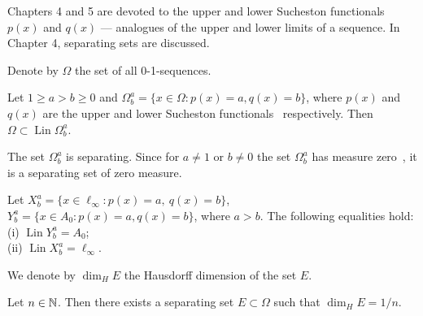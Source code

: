Chapters 4 and 5 are devoted to the upper and lower Sucheston functionals $p(x)$ and $q(x)$ —
analogues of the upper and lower limits of a sequence.
In Chapter 4, separating sets are discussed.

Denote by $\Omega$ the set of all 0-1-sequences.

	Let
	$1 \geq a > b \geq 0$ and
	$\Omega^a_b = \{x\in\Omega : p(x) = a, q(x) = b\}$,
	where $p(x)$ and $q(x)$ are the upper and lower Sucheston functionals~\cite{sucheston1967banach} respectively.
	Then $\Omega \subset \operatorname{Lin} \Omega^a_b$.

	The set $\Omega^a_b$ is separating.
	Since for $a\neq 1$ or $b\neq 0$ the set $\Omega^a_b$ has measure zero~\cite{semenov2010characteristic_eng,connor1990almost},
	it is a separating set of zero measure.

Let $X^a_b = \{x\in\ell_\infty : p(x) = a,~ q(x) = b\}$, $Y^a_b = \{x\in A_0 : p(x) = a, q(x) = b\}$, where $a>b$.
	The following equalities hold:
	\\
	(i) $\operatorname{Lin} Y^a_b = A_0$;
	\\
	(ii) $\operatorname{Lin} X^a_b = \ell_\infty$.

We denote by $\dim_H E$ the Hausdorff dimension of the set $E$.

	Let $n\in\mathbb{N}$.
	Then there exists a separating set $E\subset\Omega$ such that
	$\dim_H E = 1/n$.
